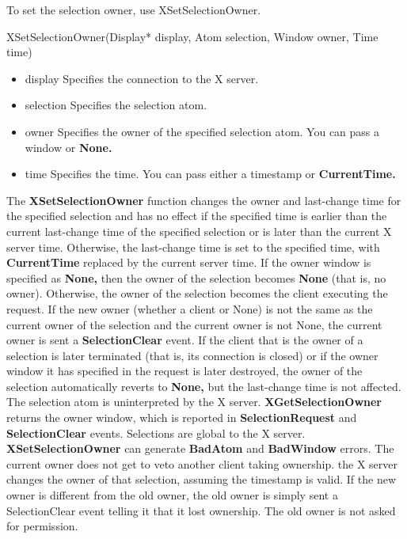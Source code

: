 \documentclass{report}
\begin{document}
\begin{itemize}
        \bigbreak \noindent 
        To set the selection owner, use XSetSelectionOwner.
        \bigbreak \noindent 
        \begin{cppcode}
            XSetSelectionOwner(Display* display, Atom selection, Window owner, Time time)
        \end{cppcode}
        \bigbreak \noindent
        \begin{itemize}
            \item display Specifies the connection to the X server.
            \item selection Specifies the selection atom.
            \item owner Specifies the owner of the specified selection atom. You can pass a window or \textbf{None.}
            \item time Specifies the time. You can pass either a timestamp or \textbf{CurrentTime.}
        \end{itemize}
        The \textbf{XSetSelectionOwner} function changes the owner and last-change time for the specified selection and has no effect if the specified time is earlier than the current last-change time of the specified selection or is later than the current X server time. Otherwise, the last-change time is set to the specified time, with \textbf{CurrentTime} replaced by the current server time. If the owner window is specified as \textbf{None,} then the owner of the selection becomes \textbf{None} (that is, no owner). Otherwise, the owner of the selection becomes the client executing the request.
        \bigbreak \noindent 
        If the new owner (whether a client or None) is not the same as the current owner of the selection and the current owner is not None, the current owner is sent a \textbf{SelectionClear} event. If the client that is the owner of a selection is later terminated (that is, its connection is closed) or if the owner window it has specified in the request is later destroyed, the owner of the selection automatically reverts to \textbf{None,} but the last-change time is not affected. The selection atom is uninterpreted by the X server. \textbf{XGetSelectionOwner} returns the owner window, which is reported in \textbf{SelectionRequest} and \textbf{SelectionClear} events. Selections are global to the X server.
        \bigbreak \noindent 
        \textbf{XSetSelectionOwner} can generate \textbf{BadAtom} and \textbf{BadWindow} errors.
        \bigbreak \noindent 
        The current owner does not get to veto another client taking ownership. the X server changes the owner of that selection, assuming the timestamp is valid. If the new owner is different from the old owner, the old owner is simply sent a SelectionClear event telling it that it lost ownership. The old owner is not asked for permission.

\end{itemize}
\end{document}
